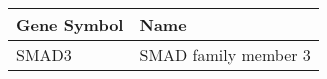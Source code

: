 \begin{tabular}{ll}
\toprule
Gene Symbol &                 Name \\
\midrule
      SMAD3 & SMAD family member 3 \\
\bottomrule
\end{tabular}
